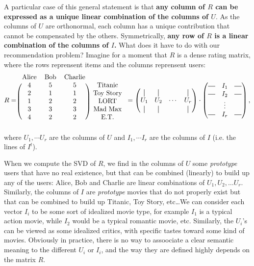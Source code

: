A particular case of this general statement is that \textbf{any column of $R$
can be expressed as a unique linear combination of the columns of $U$}. As the
columns of $U$ are orthonormal, each column has a unique contribution that
cannot be compensated by the others. Symmetrically, \textbf{any row of $R$ is a
linear combination of the columns of $I$.} What does it have to do with our
recommendation problem? Imagine for a moment that $R$ is a dense rating matrix,
where the rows reprensent items and the columns reprensent users:
$$
R = \begin{blockarray}{cccc}
  \text{Alice} & \text{Bob} & \text{Charlie} \\
\begin{block}{(ccc) c}
  4 & 5 & 5 & \text{Titanic} \\
  2 & 1 & 1 & \text{Toy Story} \\
  1 & 2 & 2 & \text{LORT} \\
  3 & 3 & 3 & \text{Mad Max} \\
  4 & 2 & 2 & \text{E.T.} \\
\end{block}
\end{blockarray}
=
\begin{pmatrix}
  \vertbar & \vertbar & & \vertbar\\
  U_1& U_2 & \cdots & U_r\\
  \vertbar & \vertbar & & \vertbar\\
\end{pmatrix}
\cdot
\begin{pmatrix}
  \horzbar& I_1 & \horzbar\\
  \horzbar& I_2 & \horzbar\\
   & \vdots & \\
  \horzbar& I_r &\horzbar \\
\end{pmatrix}
,
$$
where $U_1, \cdots U_r$ are the columns of $U$ and $I_1, \cdots I_r$ are the
columns of $I$ (i.e. the lines of $I^t$).

When we compute the SVD of $R$, we find in the columns of $U$ some
\textit{prototype} users that have no real existence, but that can be combined
(linearly) to build up any of the users: Alice, Bob and Charlie are linear
combinations of $U_1, U_2, \dots U_r$.  Similarly, the columns of $I$ are
\textit{prototype} movies that do not properly exist but that can be combined
to build up Titanic, Toy Story, etc\dots We can consider each vector $I_i$
to be some sort of idealized movie type, for example $I_1$ is a typical action
movie, while $I_2$ would be a typical romantic movie, etc. Similarly, the
$U_i$'s can be viewed as some idealized critics, with specific tastes toward
some kind of movies. Obviously in practice, there is no way to assoociate a
clear semantic meaning to the different $U_i$ or $I_i$, and the way they are
defined highly depends on the matrix $R$.

